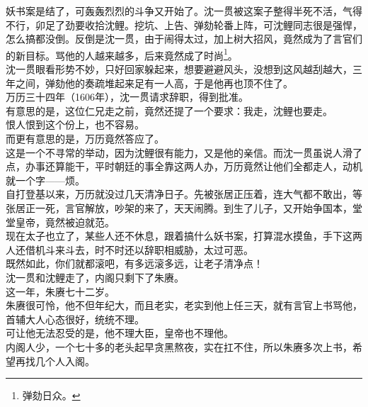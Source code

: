 \begin{multicols}{\theparacolNo}
妖书案是结了，可轰轰烈烈的斗争又开始了。沈一贯被这案子整得半死不活，气得不行，卯足了劲要收拾沈鲤。挖坑、上告、弹劾轮番上阵，可沈鲤同志很是强悍，怎么搞都没倒。反倒是沈一贯，由于闹得太过，加上树大招风，竟然成为了言官们的新目标。骂他的人越来越多，后来竟然成了时尚\footnote{弹劾日众。}。\\

沈一贯眼看形势不妙，只好回家躲起来，想要避避风头，没想到这风越刮越大，三年之间，弹劾他的奏疏堆起来足有一人高，于是他再也顶不住了。\\

万历三十四年（1606年），沈一贯请求辞职，得到批准。\\

有意思的是，这位仁兄走之前，竟然还提了一个要求：我走，沈鲤也要走。\\

恨人恨到这个份上，也不容易。\\

而更有意思的是，万历竟然答应了。\\

这是一个不寻常的举动，因为沈鲤很有能力，又是他的亲信。而沈一贯虽说人滑了点，办事还算能干，平时朝廷的事全靠这两人办，万历竟然让他们全都走人，动机就一个字——烦。\\

自打登基以来，万历就没过几天清净日子。先被张居正压着，连大气都不敢出，等张居正一死，言官解放，吵架的来了，天天闹腾。到生了儿子，又开始争国本，堂堂皇帝，竟然被迫就范。\\

现在太子也立了，某些人还不休息，跟着搞什么妖书案，打算混水摸鱼，手下这两人还借机斗来斗去，时不时还以辞职相威胁，太过可恶。\\

既然如此，你们就都滚吧，有多远滚多远，让老子清净点！\\

沈一贯和沈鲤走了，内阁只剩下了朱赓。\\

这一年，朱赓七十二岁。\\

朱赓很可怜，他不但年纪大，而且老实，老实到他上任三天，就有言官上书骂他，首辅大人心态很好，统统不理。\\

可让他无法忍受的是，他不理大臣，皇帝也不理他。\\

内阁人少，一个七十多的老头起早贪黑熬夜，实在扛不住，所以朱赓多次上书，希望再找几个人入阁。\\


\end{multicols}
